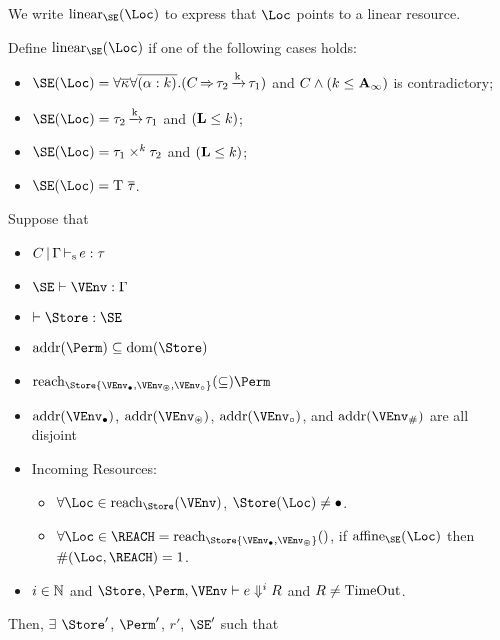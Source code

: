 We write $\Linear\SE\Loc$ to express that $\Loc$ points to a linear
resource.

Define  $\Linear\SE\Loc$ if one of the following cases holds:
\begin{itemize}
\item $\SE (\Loc) =
  \forall\Multi\kvar\forall\Multi{\bvar{\tvar}{k}}.(\qual{C}{\tau_2\tarr{k}\tau_1})$
  and $C \wedge (k \leq \mathbf{A}_\infty)$ is contradictory; 
\item $\SE (\Loc) = \tau_2\tarr{k}{\tau_1}$ and $(\mathbf{L} \leq k)$;
\item $\SE (\Loc) = \tyPair[k]{\tau_1}{\tau_2}$ and $(\mathbf{L} \leq k)$;
\item $\SE (\Loc) = \tapp{\tcon}{\Multi\tau}$.
\end{itemize}

\clearpage{}
\begin{theorem}
  Suppose that
  \begin{itemize}
  \item $C \operatorname{|} \Gamma \operatorname{\vdash_s} e : \tau$
  \item $\SE \vdash \VEnv : \E$
  \item $\vdash \Store : \SE$
  \item $\Addresses\Perm \subseteq \Dom\Store$
  \item $\Reach\Store{\Active\VEnv, \MutableBorrows\VEnv,
      \ImmutableBorrows\VEnv} \subseteq \Perm$
  \item $\Addresses{\Active\VEnv}$,
    $\Addresses{\MutableBorrows\VEnv}$,
    $\Addresses{\ImmutableBorrows\VEnv}$, and
    $\Addresses{\Suspended\VEnv}$ are all disjoint
  \item Incoming Resources: 
    \begin{itemize}
    \item $\forall \Loc\in \Reach\Store\VEnv$,  $\Store (\Loc) \ne
      \StFreed$.
    \item $\forall \Loc \in \REACH =\Reach\Store{\Active\VEnv,\MutableBorrows\VEnv}$,
      if $\Affine\SE\Loc$ then  $\MultiNumber\Loc\REACH= 1$.
    \end{itemize}
  \item  $i\in\mathbb{N}$ and $\Store, \Perm, \VEnv \vdash {e}
    \Downarrow^i R$ and $R\ne \operatorname{TimeOut}$.
  \end{itemize}
  Then,
  $\exists$ $\Store'$, $\Perm'$, $r'$, $\SE'$ such that

\end{theorem}
